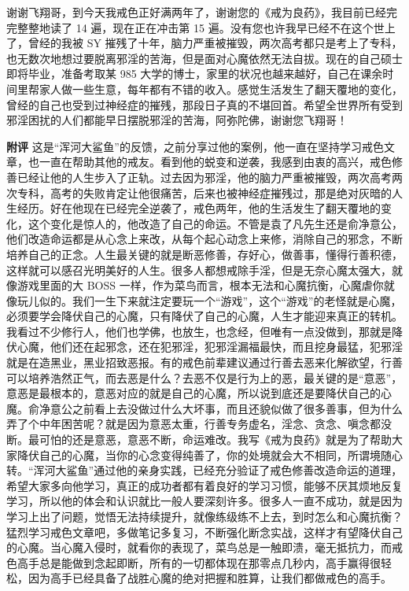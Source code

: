 \begin{case}
    谢谢飞翔哥，到今天我戒色正好满两年了，谢谢您的《戒为良药》，我目前已经完完整整地读了 14 遍，现在正在冲击第 15 遍。没有您也许我早已经不在这个世上了，曾经的我被 SY 摧残了十年，脑力严重被摧毁，两次高考都只是考上了专科，也无数次地想过要脱离邪淫的苦海，但是面对心魔依然无法自拔。现在的自己硕士即将毕业，准备考取某 985 大学的博士，家里的状况也越来越好，自己在课余时间里帮家人做一些生意，每年都有不错的收入。感觉生活发生了翻天覆地的变化，曾经的自己也受到过神经症的摧残，那段日子真的不堪回首。希望全世界所有受到邪淫困扰的人们都能早日摆脱邪淫的苦海，阿弥陀佛，谢谢您飞翔哥！

    \textbf{附评} 这是“浑河大鲨鱼”的反馈，之前分享过他的案例，他一直在坚持学习戒色文章，也一直在帮助其他的戒友。看到他的蜕变和逆袭，我感到由衷的高兴，戒色修善已经让他的人生步入了正轨。过去因为邪淫，他的脑力严重被摧毁，两次高考两次专科，高考的失败肯定让他很痛苦，后来也被神经症摧残过，那是绝对灰暗的人生经历。好在他现在已经完全逆袭了，戒色两年，他的生活发生了翻天覆地的变化，这个变化是惊人的，他改造了自己的命运。不管是袁了凡先生还是俞净意公，他们改造命运都是从心念上来改，从每个起心动念上来修，消除自己的邪念，不断培养自己的正念。人生最关键的就是断恶修善，存好心，做善事，懂得行善积德，这样就可以感召光明美好的人生。很多人都想戒除手淫，但是无奈心魔太强大，就像游戏里面的大 BOSS 一样，作为菜鸟而言，根本无法和心魔抗衡，心魔虐你就像玩儿似的。我们一生下来就注定要玩一个“游戏”，这个“游戏”的老怪就是心魔，必须要学会降伏自己的心魔，只有降伏了自己的心魔，人生才能迎来真正的转机。我看过不少修行人，他们也学佛，也放生，也念经，但唯有一点没做到，那就是降伏心魔，他们还在起邪念，还在犯邪淫，犯邪淫漏福最快，而且挖身最猛，犯邪淫就是在造黑业，黑业招致恶报。有的戒色前辈建议通过行善去恶来化解欲望，行善可以培养浩然正气，而去恶是什么？去恶不仅是行为上的恶，最关键的是“意恶”，意恶是最根本的，意恶对应的就是自己的心魔，所以说到底还是要降伏自己的心魔。俞净意公之前看上去没做过什么大坏事，而且还貌似做了很多善事，但为什么弄了个中年困苦呢？就是因为意恶太重，行善专务虚名，淫念、贪念、嗔念都没断。最可怕的还是意恶，意恶不断，命运难改。我写《戒为良药》就是为了帮助大家降伏自己的心魔，当你的心念变得纯善了，你的处境就会大不相同，所谓境随心转。“浑河大鲨鱼”通过他的亲身实践，已经充分验证了戒色修善改造命运的道理，希望大家多向他学习，真正的成功者都有着良好的学习习惯，能够不厌其烦地反复学习，所以他的体会和认识就比一般人要深刻许多。很多人一直不成功，就是因为学习上出了问题，觉悟无法持续提升，就像练级练不上去，到时怎么和心魔抗衡？猛烈学习戒色文章吧，多做笔记多复习，不断强化断念实战，这样才有望降伏自己的心魔。当心魔入侵时，就看你的表现了，菜鸟总是一触即溃，毫无抵抗力，而戒色高手总是能做到念起即断，所有的一切都体现在那零点几秒内，高手赢得很轻松，因为高手已经具备了战胜心魔的绝对把握和胜算，让我们都做戒色的高手。
\end{case}

